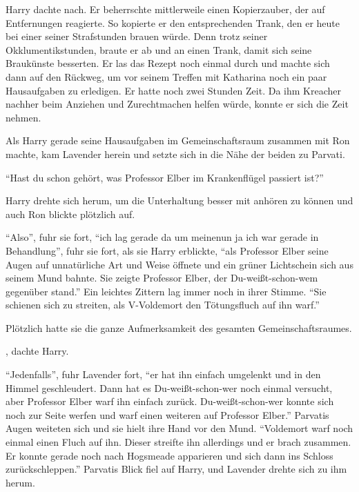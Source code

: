 Harry dachte nach. Er beherrschte mittlerweile einen Kopierzauber, der auf Entfernungen reagierte. So kopierte er den entsprechenden Trank, den er heute bei einer seiner Strafstunden brauen würde. Denn trotz seiner Okklumentikstunden, braute er ab und an einen Trank, damit sich seine Braukünste besserten. Er las das Rezept noch einmal durch und machte sich dann auf den Rückweg, um vor seinem Treffen mit Katharina noch ein paar Hausaufgaben zu erledigen. Er hatte noch zwei Stunden Zeit. Da ihm Kreacher nachher beim Anziehen und Zurechtmachen helfen würde, konnte er sich die Zeit nehmen.

\trenn

Als Harry gerade seine Hausaufgaben im Gemeinschaftsraum zusammen mit Ron machte, kam Lavender herein und setzte sich in die Nähe der beiden zu Parvati.

\enquote{Hast du schon gehört, was Professor Elber im Krankenflügel passiert ist?}

Harry drehte sich herum, um die Unterhaltung besser mit anhören zu können und auch Ron blickte plötzlich auf.

\enquote{Also}, fuhr sie fort, \enquote{ich lag gerade da um meine\abs nun ja ich war gerade in Behandlung}, fuhr sie fort, als sie Harry erblickte, \enquote{als Professor Elber seine Augen auf unnatürliche Art und Weise öffnete und ein grüner Lichtschein sich aus seinem Mund bahnte. Sie zeigte Professor Elber, der Du-weißt-schon-wem gegenüber stand.} Ein leichtes Zittern lag immer noch in ihrer Stimme. \enquote{Sie schienen sich zu streiten, als V-Voldemort den Tötungsfluch auf ihn warf.}

Plötzlich hatte sie die ganze Aufmerksamkeit des gesamten Gemeinschaftsraumes.

, dachte Harry. 

\enquote{Jedenfalls}, fuhr Lavender fort, \enquote{er hat ihn einfach umgelenkt und in den Himmel geschleudert. Dann hat es Du-weißt-schon-wer noch einmal versucht, aber Professor Elber warf ihn einfach zurück. Du-weißt-schon-wer konnte sich noch zur Seite werfen und warf einen weiteren auf Professor Elber.} Parvatis Augen weiteten sich und sie hielt ihre Hand vor den Mund. \enquote{Voldemort warf noch einmal einen Fluch auf ihn. Dieser streifte ihn allerdings und er brach zusammen. Er konnte gerade noch nach Hogsmeade apparieren und sich dann ins Schloss zurückschleppen.} Parvatis Blick fiel auf Harry, und Lavender drehte sich zu ihm herum.

